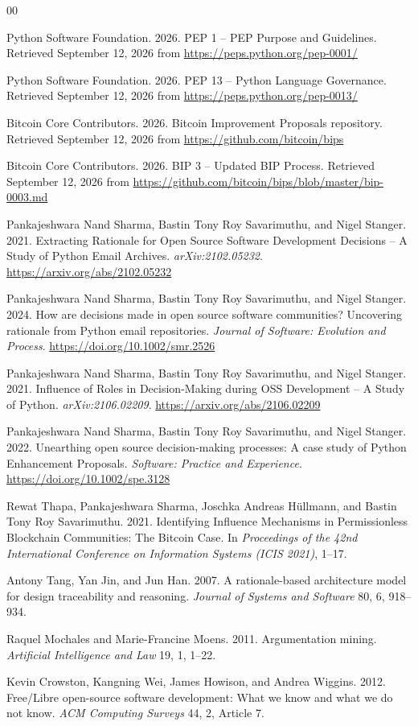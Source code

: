 \documentclass[sigconf,screen]{acmart}
\begin{document}
\begin{thebibliography}{00}

Python Software Foundation. 2026. PEP 1 -- PEP Purpose and Guidelines. Retrieved September 12, 2026 from \url{https://peps.python.org/pep-0001/}

Python Software Foundation. 2026. PEP 13 -- Python Language Governance. Retrieved September 12, 2026 from \url{https://peps.python.org/pep-0013/}

Bitcoin Core Contributors. 2026. Bitcoin Improvement Proposals repository. Retrieved September 12, 2026 from \url{https://github.com/bitcoin/bips}

Bitcoin Core Contributors. 2026. BIP 3 -- Updated BIP Process. Retrieved September 12, 2026 from \url{https://github.com/bitcoin/bips/blob/master/bip-0003.md}

Pankajeshwara Nand Sharma, Bastin Tony Roy Savarimuthu, and Nigel Stanger. 2021. Extracting Rationale for Open Source Software Development Decisions -- A Study of Python Email Archives. \emph{arXiv:2102.05232}. \url{https://arxiv.org/abs/2102.05232}

Pankajeshwara Nand Sharma, Bastin Tony Roy Savarimuthu, and Nigel Stanger. 2024. How are decisions made in open source software communities? Uncovering rationale from Python email repositories. \emph{Journal of Software: Evolution and Process}. \url{https://doi.org/10.1002/smr.2526}

Pankajeshwara Nand Sharma, Bastin Tony Roy Savarimuthu, and Nigel Stanger. 2021. Influence of Roles in Decision-Making during OSS Development -- A Study of Python. \emph{arXiv:2106.02209}. \url{https://arxiv.org/abs/2106.02209}

Pankajeshwara Nand Sharma, Bastin Tony Roy Savarimuthu, and Nigel Stanger. 2022. Unearthing open source decision-making processes: A case study of Python Enhancement Proposals. \emph{Software: Practice and Experience}. \url{https://doi.org/10.1002/spe.3128}

Rewat Thapa, Pankajeshwara Sharma, Joschka Andreas H{\"u}llmann, and Bastin Tony Roy Savarimuthu. 2021. Identifying Influence Mechanisms in Permissionless Blockchain Communities: The Bitcoin Case. In \emph{Proceedings of the 42nd International Conference on Information Systems (ICIS 2021)}, 1--17.

Antony Tang, Yan Jin, and Jun Han. 2007. A rationale-based architecture model for design traceability and reasoning. \emph{Journal of Systems and Software} 80, 6, 918--934.

Raquel Mochales and Marie-Francine Moens. 2011. Argumentation mining. \emph{Artificial Intelligence and Law} 19, 1, 1--22.

Kevin Crowston, Kangning Wei, James Howison, and Andrea Wiggins. 2012. Free/Libre open-source software development: What we know and what we do not know. \emph{ACM Computing Surveys} 44, 2, Article 7.

\end{thebibliography}
\end{document}
